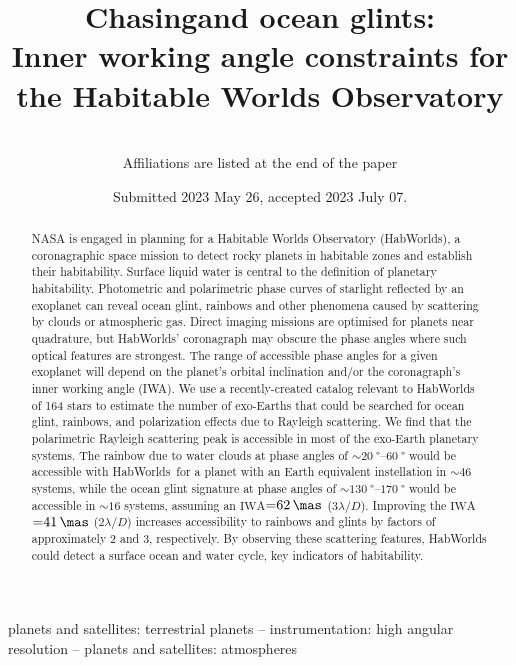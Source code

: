 \documentclass[usenatbib]{mnras}
\title{Chasing\rainbows and ocean glints:\\ Inner working angle constraints for the Habitable Worlds Observatory}
\author[Sophia R. Vaughan et al.]{%
    
    \newauthor 
    \\%
    Affiliations are listed at the end of the paper
}
\date{Submitted 2023 May 26, accepted 2023 July 07.}
\newcommand{\IWA}{\ensuremath{\mathrm{IWA}}\xspace}
\newcommand{\HWO}{HabWorlds\xspace}
\begin{document}
 

\maketitle

\begin{abstract}
NASA is engaged in planning for a Habitable Worlds Observatory (\HWO), a coronagraphic space mission to detect rocky planets in habitable zones and establish their habitability. 
%
Surface liquid water is central to the definition of planetary habitability.
%
Photometric and polarimetric phase curves of starlight reflected by an exoplanet can reveal ocean glint, rainbows and other phenomena caused by scattering by clouds or atmospheric gas.
%
Direct imaging missions are optimised for planets near quadrature, but \HWO' coronagraph may obscure the phase angles where such optical features are strongest. 
%
The range of accessible phase angles for a given exoplanet will depend on the planet's orbital inclination and/or the coronagraph's inner working angle (IWA). 
%
We use a recently-created catalog relevant to HabWorlds of 164 stars to estimate the number of exo-Earths that could be searched for ocean glint, rainbows, and polarization effects due to Rayleigh scattering. 
%
We find that the polarimetric Rayleigh scattering peak is accessible in most of the exo-Earth planetary systems.
%
The rainbow due to water clouds at phase angles of ${\sim}\qtyrange{20}{60}{\degree}$ would be accessible with \HWO\ for a planet with an Earth equivalent instellation in ${\sim}\num{46}$ systems, while the ocean glint signature at phase angles of ${\sim}\qtyrange{130}{170}{\degree}$ would be accessible in ${\sim}\num{16}$ systems, assuming an \IWA${=}\qty{62}{\mas}$ ($3\lambda/D$).
%
Improving the \IWA${=}\qty{41}{\mas}$ ($2\lambda/D$) increases accessibility to rainbows and glints by factors of approximately 2 and 3, respectively.
%
By observing these scattering features, \HWO could detect a surface ocean and water cycle, key indicators of habitability.
\end{abstract}

\begin{keywords}
    planets and satellites: terrestrial planets -- 
    instrumentation: high angular resolution -- 
    planets and satellites: atmospheres
\end{keywords}

\end{document}
